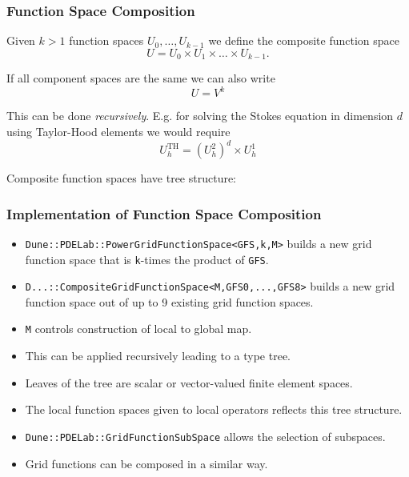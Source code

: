 \begin{frame}
\frametitle{Function Space Composition}
Given $k>1$ function spaces $U_0, \ldots, U_{k-1}$ we define the
composite function space 
\begin{equation*}
U = U_0 \times U_1 \times \ldots \times U_{k-1} .
\end{equation*}

If all component spaces are the same we can also write
\begin{equation*}
U = V^k
\end{equation*}

This can be done \textit{recursively}. E.g. for solving the Stokes equation
in dimension $d$ using Taylor-Hood elements we would require
\begin{equation*}
U_h^\text{TH} = \left( U_h^2\right)^d \times U_h^1
\end{equation*}

Composite function spaces have tree structure:
\begin{minipage}[c]{0.2\textwidth}
\end{minipage}
\end{frame}

\begin{frame}
\frametitle{Implementation of Function Space Composition}
\begin{itemize}
\item \lstinline{Dune::PDELab::PowerGridFunctionSpace<GFS,k,M>} builds a
new grid function space that is \lstinline{k}-times the product of \lstinline{GFS}.
\item \lstinline{D...::CompositeGridFunctionSpace<M,GFS0,...,GFS8>}
builds a new grid function space out of up to 9 existing grid function
spaces. 
\item \lstinline{M} controls construction of local to global map.
\item This can be applied recursively leading to a type tree.
\item Leaves of the tree are scalar or vector-valued finite element spaces.
\item The local function spaces given to local operators reflects this tree structure.
\item \lstinline{Dune::PDELab::GridFunctionSubSpace} allows the selection of subspaces.
\item Grid functions can be composed in a similar way.
\end{itemize}
\end{frame}

